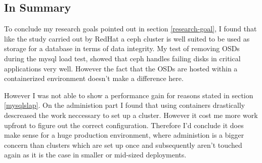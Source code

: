 \documentclass[titlepage, a4paper, 11pt]{scrartcl}
\begin{document}
        \subsection{In Summary}

        To conclude my research goals pointed out in section \ref*{research-goal}, I found that like the study carried out by RedHat\cite{redhatstudy} a ceph cluster is well suited to be used as storage for a database in terms of data integrity. My test of removing OSDs during the mysql load test, showed that ceph handles failing disks in critical applications very well. However the fact that the OSDs are hosted within a containerized environment doesn't make a difference here. 
        
        However I was not able to show a performance gain for reasons stated in section \ref*{mysqlslap}.
        On the administion part I found that using containers drastically descreased the work neccessary to set up a cluster. However it cost me more work upfront to figure out the correct configuration. Therefore I'd conclude it does make sense for a huge production environment, where administion is a bigger concern than clusters which are set up once and subsequently aren't touched again as it is the case in smaller or mid-sized deployments.
      
            
    
\end{document}

